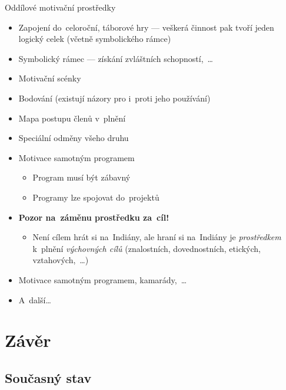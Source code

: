 \documentclass[compress, ucs, xelatex, 11pt, xcolor=dvipsnames, print, aspectratio=169,
	hyperref={
		bookmarks=true,
		unicode=true,
		colorlinks=true,
		pdftitle={Skautska vychovna metoda},
		plainpages=false,
		pdfauthor={Vojtech Zeisek},
		pdfsubject={Skautska vychovna metoda a jeji vyvoj za posledni stoleti a desetileti},
		pdfcreator={XeLaTeX},
		pdfkeywords={Junak, Pedagogika, Skaut, Skauting, Vychovna metoda},
		linkcolor=Red, %
		anchorcolor=ForestGreen, %
		citecolor=ForestGreen, %
		filecolor=ForestGreen, %
		menucolor=ForestGreen, %
		urlcolor=Sepia, %
		pdftex},
	url={hyphens, lowtilde} %
	]{beamer}
\begin{document}
\begin{frame}{Oddílové motivační prostředky}
	\begin{itemize}
		\item Zapojení do~celoroční, táborové hry --- veškerá činnost pak tvoří jeden logický celek (včetně symbolického rámce)
		\item Symbolický rámec --- získání zvláštních schopností,~\ldots
		\item Motivační scénky
		\item Bodování (existují názory pro i~proti jeho používání)
		\item Mapa postupu členů v~plnění
		\item Speciální odměny všeho druhu
		\item Motivace samotným programem
		\begin{itemize}
			\item Program musí být zábavný
			\item Programy lze spojovat do~projektů
		\end{itemize}
		\item \textbf{Pozor na~záměnu prostředku za~cíl!}
		\begin{itemize}
			\item Není cílem hrát si na~Indiány, ale hraní si na~Indiány je \textit{prostředkem} k~plnění \textit{výchovných cílů} (znalostních, dovednostních, etických, vztahových,~\ldots)
		\end{itemize}
		\item Motivace samotným programem, kamarády,~\ldots
		\item A~další\ldots
	\end{itemize}
\end{frame}

\section{Závěr}

\subsection{Současný stav}
\end{document}

